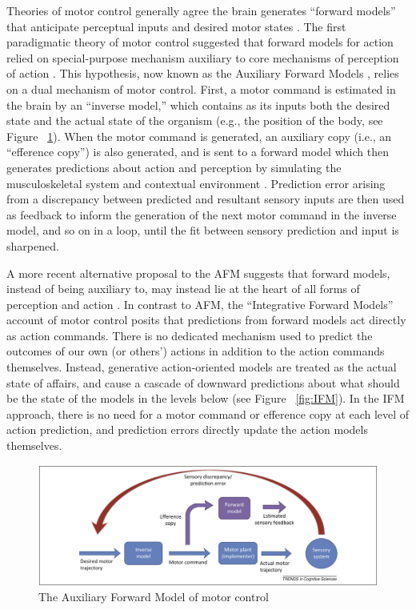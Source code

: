 Theories of motor control generally agree the brain generates ``forward models'' that anticipate perceptual inputs and desired motor states \citep{Pickering2014}. The first paradigmatic theory of motor control suggested that forward models for action relied on special-purpose mechanism auxiliary to core mechanisms of perception of action \citep{Wolpert1997}.  This hypothesis, now known as the Auxiliary Forward Models \citep[AFM, see][]{Pickering2014}, relies on a dual mechanism of motor control.  First, a motor command is estimated in the brain by an ``inverse model,'' which contains as its inputs both the desired state and the actual state of the organism (e.g., the position of the body, see Figure ~\ref{fig:AFM}).  When the motor command is generated, an auxiliary copy (i.e., an ``efference copy'') is also generated, and is sent to a forward model which then generates predictions about action and perception by simulating the musculoskeletal system and contextual environment \citep{Wolpert1995,Blakemore1998,Flanagan2003}.  Prediction error arising from a discrepancy between predicted and resultant sensory inputs are then used as feedback to inform the generation of the next motor command in the inverse model, and so on in a loop, until the fit between sensory prediction and input is sharpened.

A more recent alternative proposal to the AFM suggests that forward models, instead of being auxiliary to, may instead lie at the heart of all forms of perception and action \citep{Friston2010}.  In contrast to AFM, the ``Integrative Forward Models'' account of motor control \citep[IFM, see][]{Pickering2014} posits that predictions from forward models act directly as action commands.  There is no dedicated mechanism used to predict the outcomes of our own (or others’) actions in addition to the action commands themselves.  Instead, generative action-oriented models are treated as the actual state of affairs, and cause a cascade of downward predictions about what should be the state of the models in the levels below (see Figure ~\ref{fig:IFM}).  In the IFM approach, there is no need for a motor command or efference copy at each level of action prediction, and prediction errors directly update the action models themselves.



\begin{figure}[htbp]
  \begin{center}
    \includegraphics[scale=.4]{images/AFM.png}
      \caption{The Auxiliary Forward Model of motor control}
        \label{fig:AFM}
   \end{center}
\end{figure}

